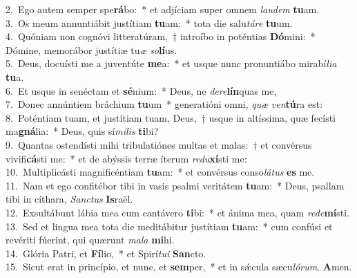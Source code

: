 {2.~}Ego autem semper spe\textbf{rá}bo:~* et adjíciam super omnem \textit{lau}\textit{dem} \textbf{tu}am.\\
{3.~}Os meum annuntiábit justítiam \textbf{tu}am:~* tota die salu\textit{tá}\textit{re} \textbf{tu}um.\\
{4.~}Quóniam non cognóvi litteratúram,~† introíbo in poténtias \textbf{Dó}mini:~* Dómine, memorábor justítiæ tu\textit{æ} \textit{so}\textbf{lí}us.\\
{5.~}Deus, docuísti me a juventúte \textbf{me}a:~* et usque nunc pronuntiábo mirabí\textit{li}\textit{a} \textbf{tu}a.\\
{6.~}Et usque in senéctam et \textbf{sé}nium:~* Deus, ne \textit{de}\textit{re}\textbf{lín}quas me,\\
{7.~}Donec annúntiem bráchium \textbf{tu}um~* generatióni omni, \textit{quæ} \textit{ven}\textbf{tú}ra est:\\
{8.~}Poténtiam tuam, et justítiam tuam, Deus,~† usque in altíssima, quæ fecísti ma\textbf{gná}lia:~* Deus, quis sí\textit{mi}\textit{lis} \textbf{ti}bi?\\
{9.~}Quantas ostendísti mihi tribulatiónes multas et malas:~† et convérsus vivifi\textbf{cá}sti me:~* et de abýssis terræ íterum \textit{re}\textit{du}\textbf{xí}sti me:\\
{10.~}Multiplicásti magnificéntiam \textbf{tu}am:~* et convérsus conso\textit{lá}\textit{tus} \textbf{es} me.\\
{11.~}Nam et ego confitébor tibi in vasis psalmi veritátem \textbf{tu}am:~* Deus, psallam tibi in cíthara, \textit{San}\textit{ctus} \textbf{Is}raël.\\
{12.~}Exsultábunt lábia mea cum cantávero \textbf{ti}bi:~* et ánima mea, quam \textit{re}\textit{de}\textbf{mí}sti.\\
{13.~}Sed et lingua mea tota die meditábitur justítiam \textbf{tu}am:~* cum confúsi et revériti fúerint, qui quærunt \textit{ma}\textit{la} \textbf{mi}hi.\\
{14.~}Glória Patri, et \textbf{Fí}lio,~* et Spirí\textit{tu}\textit{i} \textbf{San}cto.\\
{15.~}Sicut erat in princípio, et nunc, et \textbf{sem}per,~* et in sǽcula sæcu\textit{ló}\textit{rum}. \textbf{A}men.\\
